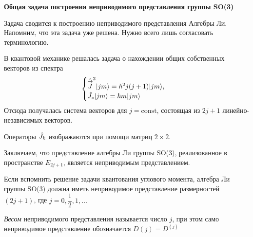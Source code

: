 \textbf{Общая задача построения неприводимого представления группы SO(3)}

Задача сводится к построению неприводимого представления Алгебры Ли. Напомним, что эта задача уже решена. Нужно всего лишь согласовать терминологию. 

В квантовой механике решалась задача о нахождении общих собственных векторов из спектра
$$
\begin{cases}
    \Hat{\overset{\to}{J}}^2 | j m \rangle = \hbar^2 j (j+1) | jm \rangle,\\
    \Hat{J_z} | j m \rangle = \hbar m | jm \rangle    
\end{cases}
$$
Отсюда получалась система векторов для $j = \mathrm{const}$, состоящая из $2j+1$ линейно-независимых векторов.

Операторы $\Hat J_k$ изображаются при помощи матриц $2 \times 2$.

Заключаем, что представление алгебры Ли группы  SO(3), реализованное в пространстве $E_{2j+1}$, является неприводимым представлением.

Если вспомнить решение задачи квантования углового момента, алгебра Ли группы SO(3) должна иметь неприводимое представление размерностей $(2j+1)$, где $j = 0, \dfrac12, 1, \ldots$

\Def \emph{Весом} неприводимого представления называется число $j$, при этом само неприводимое представление обозначается $D(j) = D^{(j)}$ 

